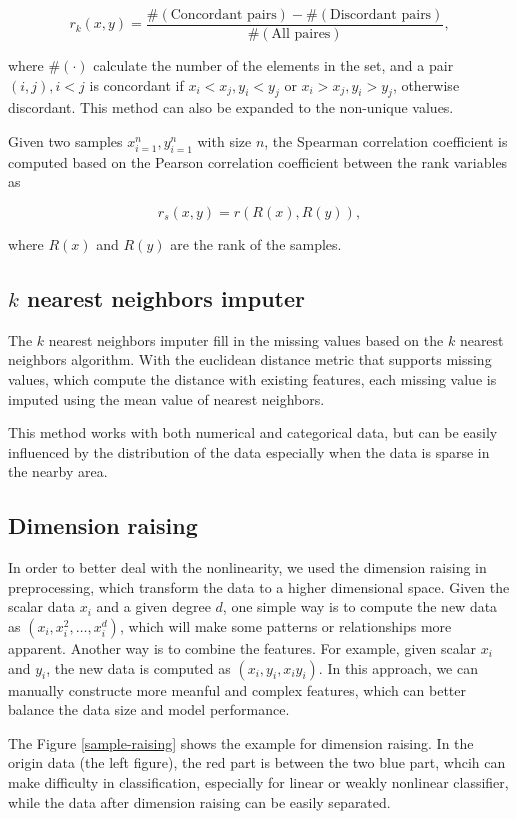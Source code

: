 \documentclass[11pt]{article}
\begin{document}
$$
  r_k (x, y) = \frac{\#(\text{Concordant pairs}) - \#(\text{Discordant pairs})}{\#(\text{All paires})},
$$

\noindent where $\#(\cdot)$ calculate the number of the elements in the set, and a pair $(i, j), i < j$ is concordant if $x_i < x_j, y_i < y_j$ or $x_i > x_j, y_i > y_j$, otherwise discordant. This method can also be expanded to the non-unique values.

Given two samples ${x}_{i=1}^n, {y}_{i=1}^n$ with size $n$, the Spearman correlation coefficient is computed based on the Pearson correlation coefficient between the rank variables as

$$
  r_s (x, y) = r(R(x), R(y)),
$$

\noindent where $R(x)$ and $R(y)$ are the rank of the samples.

\subsection{$k$ nearest neighbors imputer}

The $k$ nearest neighbors imputer fill in the missing values based on the $k$ nearest neighbors algorithm. With the euclidean distance metric that supports missing values, which compute the distance with existing features, each missing value is imputed using the mean value of nearest neighbors.

This method works with both numerical and categorical data, but can be easily influenced by the distribution of the data especially when the data is sparse in the nearby area.

\subsection{Dimension raising}

In order to better deal with the nonlinearity, we used the dimension raising in preprocessing, which transform the data to a higher dimensional space. Given the scalar data $x_i$ and a given degree $d$, one simple way is to compute the new data as $(x_i, x_i^2, \dots, x_i^d)$, which will make some patterns or relationships more apparent. Another way is to combine the features. For example, given scalar $x_i$ and $y_i$, the new data is computed as $(x_i, y_i, x_i y_i)$. In this approach, we can manually constructe more meanful and complex features, which can better balance the data size and model performance.

The Figure \ref{sample-raising} shows the example for dimension raising. In the origin data (the left figure), the red part is between the two blue part, whcih can make difficulty in classification, especially for linear or weakly nonlinear classifier, while the data after dimension raising can be easily separated.
\end{document}

